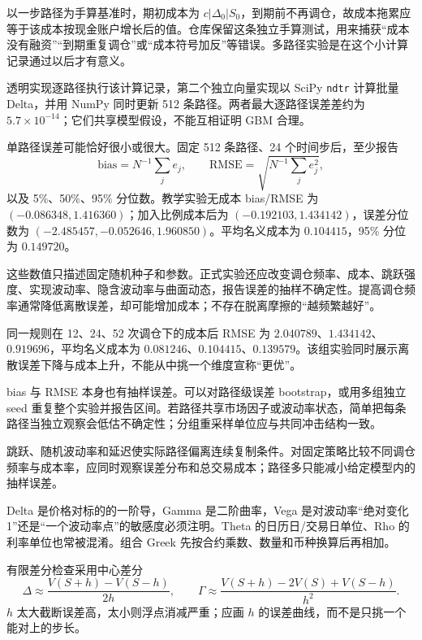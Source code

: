 以一步路径为手算基准时，期初成本为 $c|\Delta_0|S_0$，到期前不再调仓，故成本拖累应等于该成本按现金账户增长后的值。仓库保留这条独立手算测试，用来捕获“成本没有融资”“到期重复调仓”或“成本符号加反”等错误。多路径实验是在这个小计算记录通过以后才有意义。

透明实现逐路径执行该计算记录，第二个独立向量实现以 SciPy \texttt{ndtr} 计算批量 Delta，并用 NumPy 同时更新 512 条路径。两者最大逐路径误差差约为 $5.7\times10^{-14}$；它们共享模型假设，不能互相证明 GBM 合理。


单路径误差可能恰好很小或很大。固定 512 条路径、24 个时间步后，至少报告
\[
 \mathrm{bias}=N^{-1}\sum_j e_j,\qquad
 \mathrm{RMSE}=\sqrt{N^{-1}\sum_j e_j^2},
\]
以及 5\%、50\%、95\% 分位数。教学实验无成本 bias/RMSE 为 $(-0.086348,1.416360)$；加入比例成本后为 $(-0.192103,1.434142)$，误差分位数为 $(-2.485457,-0.052646,1.960850)$。平均名义成本为 $0.104415$，95\% 分位为 $0.149720$。



这些数值只描述固定随机种子和参数。正式实验还应改变调仓频率、成本、跳跃强度、实现波动率、隐含波动率与曲面动态，报告误差的抽样不确定性。提高调仓频率通常降低离散误差，却可能增加成本；不存在脱离摩擦的“越频繁越好”。

同一规则在 12、24、52 次调仓下的成本后 RMSE 为 $2.040789$、$1.434142$、$0.919696$，平均名义成本为 $0.081246$、$0.104415$、$0.139579$。该组实验同时展示离散误差下降与成本上升，不能从中挑一个维度宣称“更优”。

bias 与 RMSE 本身也有抽样误差。可以对路径级误差 bootstrap，或用多组独立 seed 重复整个实验并报告区间。若路径共享市场因子或波动率状态，简单把每条路径当独立观察会低估不确定性；分组重采样单位应与共同冲击结构一致。

跳跃、随机波动率和延迟使实际路径偏离连续复制条件。对固定策略比较不同调仓频率与成本率，应同时观察误差分布和总交易成本；路径多只能减小给定模型内的抽样误差。


Delta 是价格对标的的一阶导，Gamma 是二阶曲率，Vega 是对波动率“绝对变化 1”还是“一个波动率点”的敏感度必须注明。Theta 的日历日/交易日单位、Rho 的利率单位也常被混淆。组合 Greek 先按合约乘数、数量和币种换算后再相加。

有限差分检查采用中心差分
\[
\Delta\approx\frac{V(S+h)-V(S-h)}{2h},\qquad
\Gamma\approx\frac{V(S+h)-2V(S)+V(S-h)}{h^2}.
\]
$h$ 太大截断误差高，太小则浮点消减严重；应画 $h$ 的误差曲线，而不是只挑一个能对上的步长。

